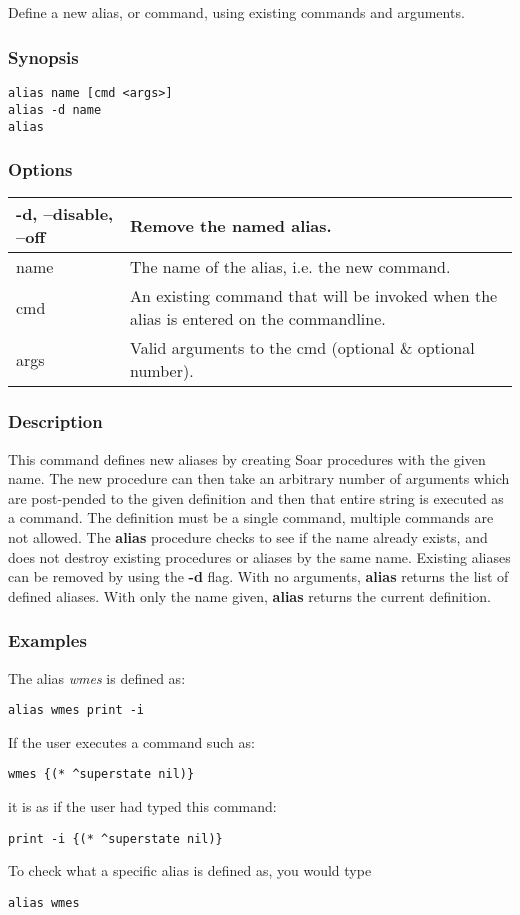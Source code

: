 \subsection{}
\label{alias}
Define a new alias, or command, using existing commands and arguments. 
\subsubsection*{Synopsis}
\begin{verbatim}
alias name [cmd <args>]
alias -d name
alias
\end{verbatim}
\subsubsection*{Options}
\begin{tabular}{|l|l|}
\hline 
 -d, --disable, --off  & Remove the named alias.  \\
 \hline 
 name  & The name of the alias, i.e. the new command.  \\
 \hline 
 cmd  & An existing command that will be invoked when the alias is entered on the commandline.  \\
 \hline 
 args  & Valid arguments to the cmd (optional \& optional number).  \\
 \hline 
\end{tabular}
\subsubsection*{Description}
 This command defines new aliases by creating Soar procedures with the given name. The new procedure can then take an arbitrary number of arguments which are post-pended to the given definition and then that entire string is executed as a command. The definition must be a single command, multiple commands are not allowed. The \textbf{alias}
 procedure checks to see if the name already exists, and does not destroy existing procedures or aliases by the same name. Existing aliases can be removed by using the \textbf{-d}
 flag. With no arguments, \textbf{alias}
 returns the list of defined aliases. With only the name given, \textbf{alias}
 returns the current definition. 
\subsubsection*{Examples}
 The alias \emph{wmes}
 is defined as: \begin{verbatim}
alias wmes print -i
\end{verbatim}
 If the user executes a command such as: \begin{verbatim}
wmes {(* ^superstate nil)}
\end{verbatim}
 it is as if the user had typed this command: \begin{verbatim}
print -i {(* ^superstate nil)}
\end{verbatim}
 To check what a specific alias is defined as, you would type \begin{verbatim}
alias wmes
\end{verbatim}
